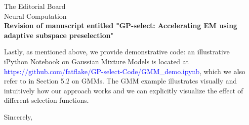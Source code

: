 \documentclass[10pt]{letter}
\newcommand{\rev}[1]{\textcolor{blue}{#1}}
\begin{document}
\begin{letter}{
The Editorial Board\\
Neural Computation\\
\vspace{10mm}
\textbf{Revision of manuscript entitled "GP-select: Accelerating EM using adaptive
subspace preselection"}
}
\begin{itemize}[topsep=3pt,itemsep=2ex,partopsep=1ex,parsep=1ex]
\end{itemize}

Lastly, as mentioned above, we provide demonstrative code: an illustrative iPython Notebook on Gaussian Mixture Models is located at \rev{https://github.com/fatflake/GP-select-Code/GMM\_demo.ipynb}, which we also refer to in Section 5.2 on GMMs. The GMM example illustrates visually and intuitively how our approach works and we can explicitly visualize the effect of different selection functions. 

\noindent \vspace{.1in}\closing{Sincerely,\vspace{-5mm}}

\end{letter}
\end{document}
